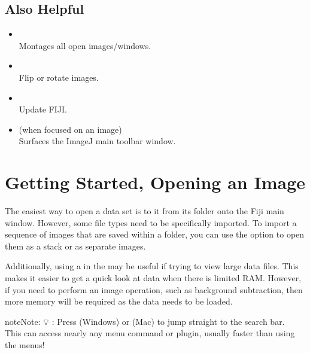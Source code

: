 \documentclass[letterpaper,10pt,english]{jupyterBook}
\begin{document}
\section{Also Helpful}
\label{\detokenize{keyboard-shortcuts:also-helpful}}\begin{itemize}
\item {} 
\sphinxAtStartPar
{}\\
Montages all open images/windows.

\item {} 
\sphinxAtStartPar
{}\\
Flip or rotate images.

\item {} 
\sphinxAtStartPar
{}\\
Update FIJI.

\item {} 
\sphinxAtStartPar
{} (when focused on an image)\\
Surfaces the ImageJ main toolbar window.

\end{itemize}

\sphinxstepscope


\chapter{Getting Started, Opening an Image}
\label{\detokenize{basics:getting-started-opening-an-image}}\label{\detokenize{basics::doc}}
\sphinxAtStartPar
The easiest way to open a data set is to  it from its folder onto the Fiji main window. However, some file types
need to be specifically imported. To import a sequence of images that are saved within a folder,
you can use the  option to open them as a stack or as
separate images.

\sphinxAtStartPar
Additionally, using a  in the  may be useful if trying to view
large data files. This makes it easier to get a quick look at data when there is limited RAM.
However, if you need to perform an image operation, such as background subtraction, then
more memory will be required as the data needs to be loaded.

\begin{sphinxadmonition}{note}{Note:}
\sphinxAtStartPar
💡 : Press  (Windows) or  (Mac) to jump straight to the search bar.\\
This can access nearly any menu command or plugin, usually faster than using the menus!
\end{sphinxadmonition}
\end{document}
